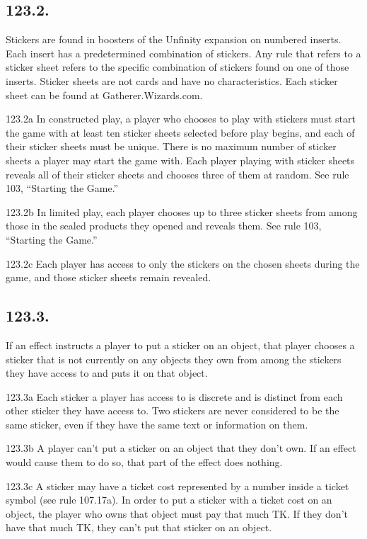 \subsection*{123.2.}
Stickers are found in boosters of the Unfinity expansion on numbered inserts. Each insert has a predetermined combination of stickers. Any rule that refers to a sticker sheet refers to the specific combination of stickers found on one of those inserts. Sticker sheets are not cards and have no characteristics. Each sticker sheet can be found at Gatherer.Wizards.com.

123.2a In constructed play, a player who chooses to play with stickers must start the game with at least ten sticker sheets selected before play begins, and each of their sticker sheets must be unique. There is no maximum number of sticker sheets a player may start the game with. Each player playing with sticker sheets reveals all of their sticker sheets and chooses three of them at random. See rule 103, “Starting the Game.”

123.2b In limited play, each player chooses up to three sticker sheets from among those in the sealed products they opened and reveals them. See rule 103, “Starting the Game.”

123.2c Each player has access to only the stickers on the chosen sheets during the game, and those sticker sheets remain revealed.

\subsection*{123.3.}
If an effect instructs a player to put a sticker on an object, that player chooses a sticker that is not currently on any objects they own from among the stickers they have access to and puts it on that object.

123.3a Each sticker a player has access to is discrete and is distinct from each other sticker they have access to. Two stickers are never considered to be the same sticker, even if they have the same text or information on them.

123.3b A player can’t put a sticker on an object that they don’t own. If an effect would cause them to do so, that part of the effect does nothing.

123.3c A sticker may have a ticket cost represented by a number inside a ticket symbol (see rule 107.17a). In order to put a sticker with a ticket cost on an object, the player who owns that object must pay that much {TK}. If they don’t have that much {TK}, they can’t put that sticker on an object.

